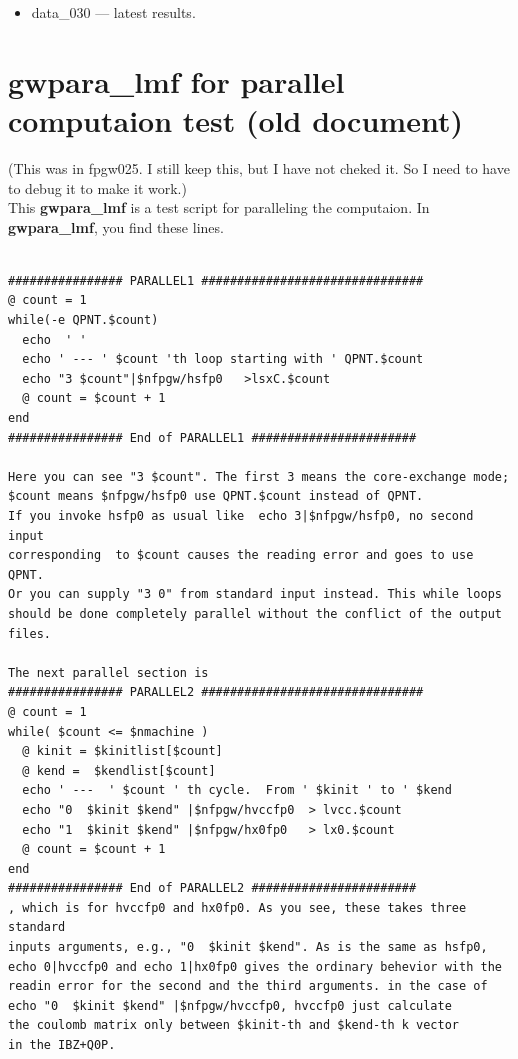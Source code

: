 \documentclass[a4paper,10pt,epsf,fleqn]{article}
\begin{document}
{{{\begin{itemize}
\item 
data\_030 --- latest results.

\end{itemize}


\newpage
\section{{\bf gwpara\_lmf} for parallel computaion test (old document)}

(This was in fpgw025. I still keep this, 
but I have not cheked it. So I need to have to debug it to make it work.)\\

This {\bf gwpara\_lmf} is a test script for paralleling the computaion.
In {\bf gwpara\_lmf},  you find these lines.

{\baselineskip=3.2mm
\begin{verbatim}

################ PARALLEL1 ###############################
@ count = 1
while(-e QPNT.$count)
  echo  ' '
  echo ' --- ' $count 'th loop starting with ' QPNT.$count
  echo "3 $count"|$nfpgw/hsfp0   >lsxC.$count
  @ count = $count + 1
end
################ End of PARALLEL1 #######################

Here you can see "3 $count". The first 3 means the core-exchange mode;
$count means $nfpgw/hsfp0 use QPNT.$count instead of QPNT.
If you invoke hsfp0 as usual like  echo 3|$nfpgw/hsfp0, no second input 
corresponding  to $count causes the reading error and goes to use QPNT.
Or you can supply "3 0" from standard input instead. This while loops 
should be done completely parallel without the conflict of the output 
files.

The next parallel section is 
################ PARALLEL2 ###############################
@ count = 1
while( $count <= $nmachine )
  @ kinit = $kinitlist[$count]
  @ kend =  $kendlist[$count]
  echo ' ---  ' $count ' th cycle.  From ' $kinit ' to ' $kend 
  echo "0  $kinit $kend" |$nfpgw/hvccfp0  > lvcc.$count	
  echo "1  $kinit $kend" |$nfpgw/hx0fp0   > lx0.$count
  @ count = $count + 1
end
################ End of PARALLEL2 #######################
, which is for hvccfp0 and hx0fp0. As you see, these takes three standard 
inputs arguments, e.g., "0  $kinit $kend". As is the same as hsfp0, 
echo 0|hvccfp0 and echo 1|hx0fp0 gives the ordinary behevior with the 
readin error for the second and the third arguments. in the case of 
echo "0  $kinit $kend" |$nfpgw/hvccfp0, hvccfp0 just calculate
the coulomb matrix only between $kinit-th and $kend-th k vector 
in the IBZ+Q0P.


\end{verbatim}}}}}
\end{document}
